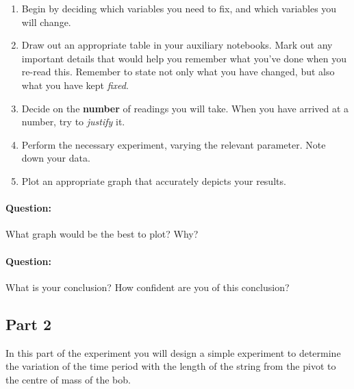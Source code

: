 \begin{enumerate}
    \item Begin by deciding which variables you need to fix, and which variables you will change.
    
    \item Draw out an appropriate table in your auxiliary notebooks. Mark out any important details that would help you remember what you've done when you re-read this. Remember to state not only what you have changed, but also what you have kept \textit{fixed}.
    
    \item Decide on the \textbf{number} of readings you will take. When you have arrived at a number, try to \textit{justify} it.
    
    \item Perform the necessary experiment, varying the relevant parameter. Note down your data.
    
    \item Plot an appropriate graph that accurately depicts your results.
\end{enumerate}

\begin{question}
\paragraph{Question:} What graph would be the best to plot? Why? ~\\

\paragraph{Question:} What is your conclusion? How confident are you of this conclusion?
\end{question}


\subsection{Part 2}

In this part of the experiment you will design a simple experiment to determine the variation of the time period with the length of the string from the pivot to the centre of mass of the bob.

